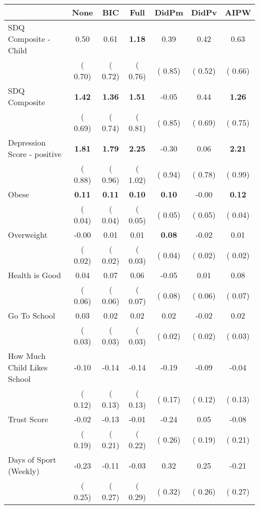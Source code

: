 \begin{tabular}{l c c c c c c}
\toprule
 & None & BIC & Full & DidPm & DidPv & AIPW \\
\midrule
SDQ Composite - Child &      0.50 &      0.61 & \textbf{      1.18 } &      0.39 &      0.42 &      0.63 \\
& (     0.70) & (     0.72) & (     0.76) & (     0.85) & (     0.52) & (     0.66) \\
SDQ Composite & \textbf{      1.42 } & \textbf{      1.36 } & \textbf{      1.51 } &     -0.05 &      0.44 & \textbf{     1.26} \\
& (     0.69) & (     0.74) & (     0.81) & (     0.85) & (     0.69) & (     0.75) \\
Depression Score - positive & \textbf{      1.81 } & \textbf{      1.79 } & \textbf{      2.25 } &     -0.30 &      0.06 & \textbf{     2.21} \\
& (     0.88) & (     0.96) & (     1.02) & (     0.94) & (     0.78) & (     0.99) \\
Obese & \textbf{      0.11 } & \textbf{      0.11 } & \textbf{      0.10 } & \textbf{      0.10 } &     -0.00 & \textbf{     0.12} \\
& (     0.04) & (     0.04) & (     0.05) & (     0.05) & (     0.05) & (     0.04) \\
Overweight &     -0.00 &      0.01 &      0.01 & \textbf{      0.08 } &     -0.02 &      0.01 \\
& (     0.02) & (     0.02) & (     0.03) & (     0.04) & (     0.02) & (     0.02) \\
Health is Good &      0.04 &      0.07 &      0.06 &     -0.05 &      0.01 &      0.08 \\
& (     0.06) & (     0.06) & (     0.07) & (     0.08) & (     0.06) & (     0.07) \\
Go To School &      0.03 &      0.02 &      0.02 &      0.02 &     -0.02 &      0.02 \\
& (     0.03) & (     0.03) & (     0.03) & (     0.02) & (     0.02) & (     0.03) \\
How Much Child Likes School &     -0.10 &     -0.14 &     -0.14 &     -0.19 &     -0.09 &     -0.04 \\
& (     0.12) & (     0.13) & (     0.13) & (     0.17) & (     0.12) & (     0.13) \\
Trust Score &     -0.02 &     -0.13 &     -0.01 &     -0.24 &      0.05 &     -0.08 \\
& (     0.19) & (     0.21) & (     0.22) & (     0.26) & (     0.19) & (     0.21) \\
Days of Sport (Weekly) &     -0.23 &     -0.11 &     -0.03 &      0.32 &      0.25 &     -0.21 \\
& (     0.25) & (     0.27) & (     0.29) & (     0.32) & (     0.26) & (     0.27) \\
\bottomrule
\end{tabular}
